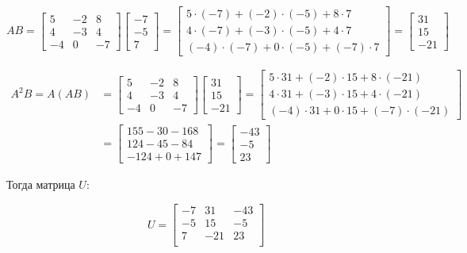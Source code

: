 \documentclass[a4paper,12pt]{article}
\begin{document}
	\[
	AB =
	\begin{bmatrix}
		5 & -2 & 8 \\
		4 & -3 & 4 \\
		-4 & 0 & -7
	\end{bmatrix}
	\begin{bmatrix}-7\\-5\\7\end{bmatrix}
	=
	\begin{bmatrix}
		5\cdot(-7) + (-2)\cdot(-5) + 8\cdot7 \\
		4\cdot(-7) + (-3)\cdot(-5) + 4\cdot7 \\
		(-4)\cdot(-7) + 0\cdot(-5) + (-7)\cdot7
	\end{bmatrix}
	=
	\begin{bmatrix} 31 \\ 15 \\ -21 \end{bmatrix}
	\]
	
	\begin{align*}
		A^2B = A(AB) &=
		\begin{bmatrix}
			5 & -2 & 8 \\
			4 & -3 & 4 \\
			-4 & 0 & -7
		\end{bmatrix}
		\begin{bmatrix}31\\15\\-21\end{bmatrix}
		=
		\begin{bmatrix}
			5\cdot31 + (-2)\cdot15 + 8\cdot(-21) \\
			4\cdot31 + (-3)\cdot15 + 4\cdot(-21) \\
			(-4)\cdot31 + 0\cdot15 + (-7)\cdot(-21)
		\end{bmatrix} \\[8pt]
		&=
		\begin{bmatrix}
			155 - 30 - 168 \\
			124 - 45 - 84 \\
			-124 + 0 + 147
		\end{bmatrix}
		=
		\begin{bmatrix} -43 \\ -5 \\ 23 \end{bmatrix}
	\end{align*}
	
	Тогда матрица \(U\):
	
	\[
	U = 
	\begin{bmatrix}
		-7 & 31 & -43 \\
		-5 & 15 & -5 \\
		7 & -21 & 23 \\
	\end{bmatrix}
	\]
	
\end{document}
